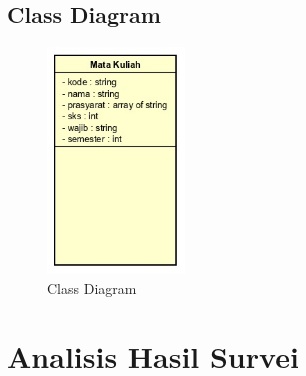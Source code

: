 \subsection{Class Diagram}
\begin{figure}[H]
    \centering
    \includegraphics[height=6cm]{Gambar/Class Diagram.jpg}
    \caption{Class Diagram}
    \label{fig:gambarClassDiagram}
\end{figure}

\section{Analisis Hasil Survei}